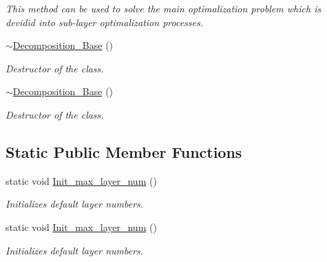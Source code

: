 \begin{DoxyCompactItemize}
\begin{DoxyCompactList}\small\item\em This method can be used to solve the main optimalization problem which is devidid into sub-\/layer optimalization processes. \end{DoxyCompactList}\item 
\hyperlink{class_decomposition___base_ae0c67b0a277454c77e0b50e3dfd0ee84}{$\sim$\+Decomposition\+\_\+\+Base} ()
\begin{DoxyCompactList}\small\item\em Destructor of the class. \end{DoxyCompactList}\item 
\hyperlink{class_decomposition___base_ae0c67b0a277454c77e0b50e3dfd0ee84}{$\sim$\+Decomposition\+\_\+\+Base} ()
\begin{DoxyCompactList}\small\item\em Destructor of the class. \end{DoxyCompactList}\end{DoxyCompactItemize}
\subsection*{Static Public Member Functions}
\begin{DoxyCompactItemize}
\item 
static void \hyperlink{class_decomposition___base_a24c7d112a4f3b2346c3d885316f3bfa1}{Init\+\_\+max\+\_\+layer\+\_\+num} ()
\begin{DoxyCompactList}\small\item\em Initializes default layer numbers. \end{DoxyCompactList}\item 
static void \hyperlink{class_decomposition___base_abdb59c6b355a338eb958f58d6f28b966}{Init\+\_\+max\+\_\+layer\+\_\+num} ()
\begin{DoxyCompactList}\small\item\em Initializes default layer numbers. \end{DoxyCompactList}\end{DoxyCompactItemize}
